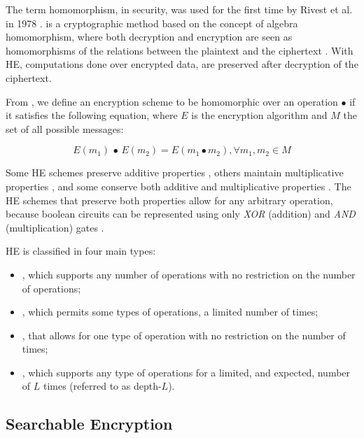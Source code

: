The term homomorphism, in security, was used for the first time by Rivest et al. in 1978 \autocite{Rivest1978-vt}.
 is a cryptographic method based on the concept of algebra homomorphism, where both decryption and encryption are seen as homomorphisms of the relations between the plaintext and the ciphertext \autocite{Acar2018-mp, Fontaine2007-sv}. With \gls{HE}, computations done over encrypted data, are preserved after decryption of the ciphertext. 

From \autocite{Acar2018-mp}, we define an encryption scheme to be homomorphic over an operation $\bullet$ if it satisfies the following equation, where $E$ is the encryption algorithm and $M$ the set of all possible messages: 

\begin{equation}
    E(m_{1}) \, \bullet \, E(m_{2}) = E(m_{1} \bullet m_{2}), \forall m_{1}, m_{2} \in M
\end{equation}


Some \gls{HE} schemes preserve additive properties \autocite{Paillier1999-js}, others maintain multiplicative properties \autocite{Rivest1978-mu, Elgamal1985-rk}, and some conserve both additive and multiplicative properties \autocite{Gentry2009-zv}. The \gls{HE} schemes that preserve both properties allow for any arbitrary operation, because boolean circuits can be represented using only \emph{XOR} (addition) and \emph{AND} (multiplication) gates \autocite{Acar2018-mp}. 

\gls{HE} is classified in four main types: 
\begin{itemize}
    \item {}, which supports any number of operations with no restriction on the number of operations; 
    \item {}, which permits some types of operations, a limited number of times;
    \item {}, that allows for one type of operation with no restriction on the number of times;
    \item {} \autocite{Brakerski2014-nm}, which supports any type of operations for a limited, and expected, number of $L$ times (referred to as depth-$L$).
\end{itemize}


\subsection{Searchable Encryption}
\label{ch2:sec:searchable-encryption}


